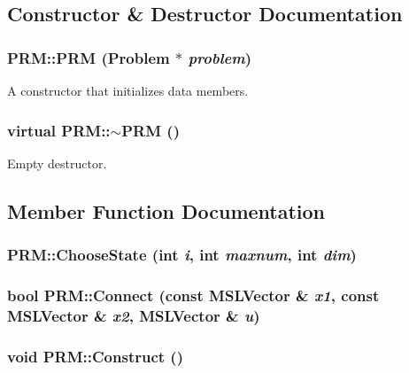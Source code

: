 \subsection{Constructor \& Destructor Documentation}
\subsubsection{\setlength{\rightskip}{0pt plus 5cm}PRM::PRM ({\bf Problem} $\ast$ {\em problem})}\label{classPRM_a0}


A constructor that initializes data members.

\subsubsection{\setlength{\rightskip}{0pt plus 5cm}virtual PRM::$\sim$PRM ()\hspace{0.3cm}{\tt  [inline, virtual]}}\label{classPRM_a1}


Empty destructor.



\subsection{Member Function Documentation}
\subsubsection{ PRM::Choose\-State (int {\em i}, int {\em maxnum}, int {\em dim})\hspace{0.3cm}{\tt  [protected, virtual]}}\label{classPRM_b2}


\subsubsection{\setlength{\rightskip}{0pt plus 5cm}bool PRM::Connect (const {\bf MSLVector} \& {\em x1}, const {\bf MSLVector} \& {\em x2}, {\bf MSLVector} \& {\em u})\hspace{0.3cm}{\tt  [protected, virtual]}}\label{classPRM_b1}


\subsubsection{\setlength{\rightskip}{0pt plus 5cm}void PRM::Construct ()\hspace{0.3cm}{\tt  [virtual]}}\label{classPRM_a2}


